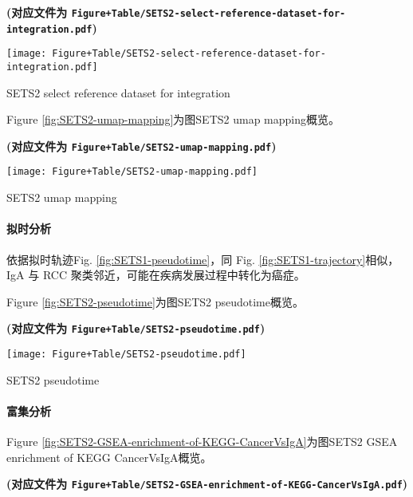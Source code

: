 \documentclass[
]{article}
\begin{document}
\textbf{(对应文件为 \texttt{Figure+Table/SETS2-select-reference-dataset-for-integration.pdf})}

\def\@captype{figure}
\begin{center}
\texttt{[image: Figure+Table/SETS2-select-reference-dataset-for-integration.pdf]}
\caption{SETS2 select reference dataset for integration}\label{fig:SETS2-select-reference-dataset-for-integration}
\end{center}

Figure \ref{fig:SETS2-umap-mapping}为图SETS2 umap mapping概览。

\textbf{(对应文件为 \texttt{Figure+Table/SETS2-umap-mapping.pdf})}

\def\@captype{figure}
\begin{center}
\texttt{[image: Figure+Table/SETS2-umap-mapping.pdf]}
\caption{SETS2 umap mapping}\label{fig:SETS2-umap-mapping}
\end{center}

\hypertarget{ux62dfux65f6ux5206ux6790-1}{%
\paragraph{拟时分析}\label{ux62dfux65f6ux5206ux6790-1}}

依据拟时轨迹Fig. \ref{fig:SETS1-pseudotime}，同 Fig. \ref{fig:SETS1-trajectory}相似，IgA 与 RCC 聚类邻近，可能在疾病发展过程中转化为癌症。

Figure \ref{fig:SETS2-pseudotime}为图SETS2 pseudotime概览。

\textbf{(对应文件为 \texttt{Figure+Table/SETS2-pseudotime.pdf})}

\def\@captype{figure}
\begin{center}
\texttt{[image: Figure+Table/SETS2-pseudotime.pdf]}
\caption{SETS2 pseudotime}\label{fig:SETS2-pseudotime}
\end{center}

\hypertarget{ux5bccux96c6ux5206ux6790}{%
\paragraph{富集分析}\label{ux5bccux96c6ux5206ux6790}}

Figure \ref{fig:SETS2-GSEA-enrichment-of-KEGG-CancerVsIgA}为图SETS2 GSEA enrichment of KEGG CancerVsIgA概览。

\textbf{(对应文件为 \texttt{Figure+Table/SETS2-GSEA-enrichment-of-KEGG-CancerVsIgA.pdf})}
\end{document}
